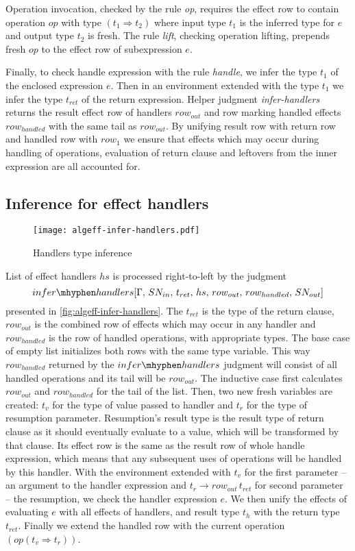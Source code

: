 \documentclass[inz, english, shortabstract]{iithesis}
\begin{document}
Operation invocation, checked by the rule \emph{op}, requires the effect row to contain operation $ op $ with type $ (t_1 \Rightarrow t_2) $ where input type $ t_1 $ is the inferred type for $ e $ and output type $ t_2 $ is fresh.
The rule \emph{lift}, checking operation lifting, prepends fresh $ op $ to the effect row of subexpression $e$.

Finally, to check handle expression with the rule \emph{handle}, we infer the type $t_1$ of the enclosed expression $e$.
Then in an environment extended with the type $t_1$ we infer the type $t_{ret}$ of the return expression.
Helper judgment \textit{infer-handlers} returns the result effect row of handlers $row_{out}$ and row marking handled effects $ row_{handled} $ with the same tail as $row_{out}$.
By unifying result row with return row and handled row with $row_1$ we ensure that effects which may occur during handling of operations, evaluation of return clause and leftovers from the inner expression are all accounted for.

\subsection{Inference for effect handlers}

\begin{figure}
  \centering
  \texttt{[image: algeff-infer-handlers.pdf]}
  \caption{Handlers type inference} 
  \label{fig:algeff-infer-handlers} 
\end{figure} 

List of effect handlers $ hs $ is processed right-to-left by the judgment 
$$ infer\mhyphen handlers [\Gamma , \, SN_{in} , \, t_{ret} , \, hs , \, row_{out} , \, row_{handled} , \, SN_{out}] $$
presented in \autoref{fig:algeff-infer-handlers}.
The $ t_{ret} $ is the type of the return clause, $ row_{out} $ is the combined row of effects which may occur in any handler and $ row_{handled} $ is the row of handled operations, with appropriate types.
The base case of empty list initializes both rows with the same type variable.
This way $ row_{handled} $ returned by the $infer\mhyphen handlers$ judgment will consist of all handled operations and its tail will be $ row_{out} $.
The inductive case first calculates $ row_{out} $ and $ row_{handled} $ for the tail of the list.
Then, two new fresh variables are created: $ t_v $ for the type of value passed to handler and $ t_r $ for the type of resumption parameter.
Resumption's result type is the result type of return clause as it should eventually evaluate to a value, which will be transformed by that clause.
Its effect row is the same as the result row of whole handle expression, which means that any subsequent uses of operations will be handled by this handler.
With the environment extended with $ t_v $ for the first parameter -- an argument to the handler expression and $ t_r \rightarrow row_{out} \, t_{ret} $ for second parameter -- the resumption, we check the handler expression $ e $.
We then unify the effects of evaluating $ e $ with all effects of handlers, and result type $ t_{h} $ with the return type $ t_{ret} $.
Finally we extend the handled row with the current operation $(op (t_v \Rightarrow t_r))$.
\end{document}
